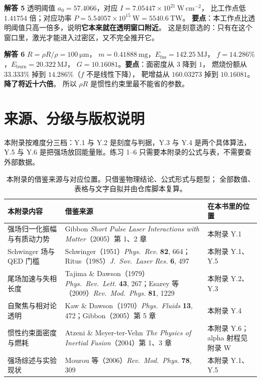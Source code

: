 \textbf{解答 5} 透明阈值 $a_0 = 57.4066$，对应
$I = 7.05447\times10^{21}\ \mathrm{W\,cm^{-2}}$，
比工作点低 $1.41754$ 倍；对应功率
$P = 5.54057\times10^{15}\ \mathrm{W} = 5540.6\ \mathrm{TW}$。
\textbf{要点}：本工作点比透明阈值只高一倍多，说明\textbf{它本来就在透明窗口附近}。
这是刻意选的：只有在这个窗口里，激光才能进入过密区，又不完全推开它。

\textbf{解答 6} $R = \rho R/\rho = 100\ \mathrm{\mu m}$，
$m = 0.41888\ \mathrm{mg}$，$E_{\mathrm{fus}} = 142.25\ \mathrm{MJ}$，
$f = 14.286\%$，$E_{\mathrm{burn}} = 20.322\ \mathrm{MJ}$，
$G = 10.16081$。\textbf{要点}：面密度从 $3$ 降到 $1$，
燃烧份额从 $33.333\%$ 掉到 $14.286\%$（$f$ 不是线性下降），
靶增益从 $160.03273$ 掉到 $10.16081$。\textbf{降了将近十六倍}。
所以 $\rho R$ 是惯性约束里最不能省的参数。

\section{来源、分级与版权说明}
\label{sec:app-y-source}

\begingroup\small
本附录按难度分三档：Y.1 与 Y.2 是刻度与判据，Y.3 与 Y.4 是两个具体算法，
Y.5 与 Y.6 是把强场放回能量账。练习 1--6 只需要本附录的公式与表，不需要查外部数据。

\begin{table}[htbp]
\centering
\small
\caption{本附录的借鉴来源与对应位置。只借鉴物理结论、公式形式与题型；
全部数值、表格与文字自拟并由仓库脚本复算。}
\label{tab:app-y-source}
\begin{tabular}{p{3.4cm}p{5.6cm}p{3.6cm}}
\toprule
本附录内容 & 借鉴来源 & 在本书里的位置 \\
\midrule
强场归一化振幅与有质动力势 &
Gibbon \emph{Short Pulse Laser Interactions with Matter}（2005）第 1、2 章 &
本附录 Y.1 \\
Schwinger 场与 QED 门槛 &
Schwinger（1951）\emph{Phys.\ Rev.} \textbf{82}, 664；Ritus（1985）\emph{J.\ Sov.\ Laser Res.} \textbf{6}, 497 &
本附录 Y.1、Y.5 \\
尾场加速与失相长度 &
Tajima \& Dawson（1979）\emph{Phys.\ Rev.\ Lett.} \textbf{43}, 267；Esarey 等（2009）\emph{Rev.\ Mod.\ Phys.} \textbf{81}, 1229 &
本附录 Y.2、Y.3 \\
自聚焦与相对论透明 &
Kaw \& Dawson（1970）\emph{Phys.\ Fluids} \textbf{13}, 472；Gibbon（2005）第 5 章 &
本附录 Y.4 \\
惯性约束面密度与燃耗 &
Atzeni \& Meyer-ter-Vehn \emph{The Physics of Inertial Fusion}（2004）第 1、3 章 &
本附录 Y.6；alpha 射程见附录 W \\
强场综述与实验现状 &
Mourou 等（2006）\emph{Rev.\ Mod.\ Phys.} \textbf{78}, 309 &
本附录 Y.1、Y.5 \\
\bottomrule
\end{tabular}

\end{table}

